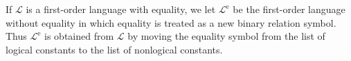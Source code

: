 If $\mathcal{L}$ is a first-order language with equality, we let $\mathcal{L}^{\text{e}}$ be the first-order language without equality in which equality is treated as a new binary relation symbol. Thus $\mathcal{L}^{\text{e}}$ is obtained from $\mathcal{L}$ by moving the equality symbol from the list of logical constants to the list of nonlogical constants.
